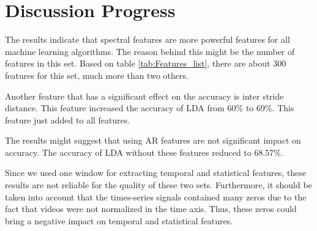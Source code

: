 \section{Discussion Progress}

The results indicate that spectral features are more powerful features for all machine learning algorithms. The reason behind this might be the number of features in this set. Based on table \ref{tab:Features_list}, there are about 300 features for this set, much more than two others.

Another feature that has a significant effect on the accuracy is inter stride distance. This feature increased the accuracy of LDA from 60\% to 69\%. This feature just added to all features. 
 
The results might suggest that using AR features are not significant impact on accuracy. The accuracy of LDA without these features reduced to 68.57\%. 

Since we used one window for extracting temporal and statistical features, these results are not reliable for the quality of these two sets. Furthermore, it should be taken into account that the times-series signals contained many zeros due to the fact that videos were not normalized in the time axis. Thus, these zeros could bring a negative impact on temporal and statistical features.










